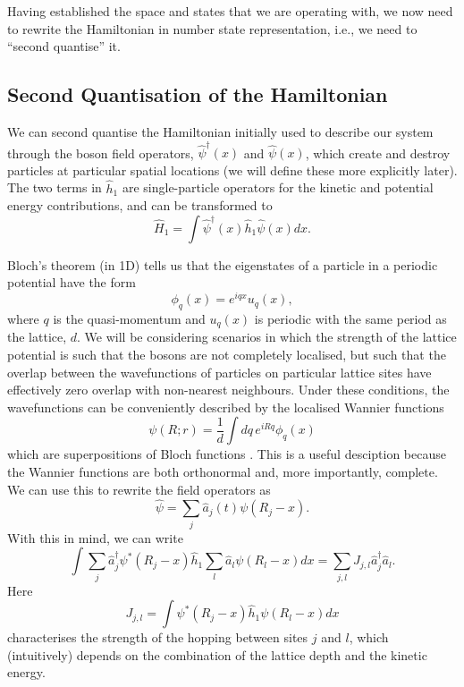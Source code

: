 \documentclass[a4paper,10pt]{article}
\begin{document}
Having established the space and states that we are operating with, we now need to rewrite the Hamiltonian in number state representation, i.e., we need to
``second quantise'' it. 

\subsection{Second Quantisation of the Hamiltonian}
We can second quantise the Hamiltonian initially used to describe our system through the boson field operators, $\hat{\psi}^{\dagger}(x)$ and $\hat{\psi}(x)$, which create and destroy 
particles at particular spatial locations (we will define these more explicitly later). The two terms in $\hat{h}_1$ are single-particle
operators for the kinetic and potential energy contributions, and can be transformed to
\begin{equation}
 \hat{H}_1=\int  \hat{\psi}^{\dagger}(x) \hat{h}_1   \hat{\psi}(x)dx.
\end{equation}

Bloch's theorem (in 1D) \cite{Bloch1929,Kittel1987} tells us that the eigenstates of a particle in a periodic potential have the form
\begin{equation}
 \phi_q(x)=e^{iqx}u_{q}(x),
\end{equation}
where $q$ is the quasi-momentum and $u_q(x)$ is periodic with the same period as the lattice, $d$. We will be considering scenarios in which the strength of the lattice potential
is such that the bosons are not completely localised, but such that the overlap between the wavefunctions of particles on particular lattice sites have effectively zero overlap 
with non-nearest neighbours. Under these conditions, the wavefunctions can be conveniently described by the localised Wannier functions
\begin{equation}
\psi(R;r)=\frac{1}{d}\int dq\, e^{iRq}\phi_q(x)
\end{equation}
which are superpositions of Bloch functions \cite{Kittel1987,Wannier1937}. This is a useful desciption because the Wannier functions are both orthonormal and, more importantly, complete.
We can use this to rewrite the field operators as 
\begin{equation}
\label{field_operators_wannier}
 \hat{\psi}=\sum_j \hat{a}_{j}(t)\psi(R_j-x).
\end{equation}
With this in mind, we can write
\begin{equation}
 \int  \sum_j\hat{a}_j^{\dagger}\psi^{*}(R_j-x) \hat{h}_1  \sum_l  \hat{a}_l\psi(R_l-x)dx=\sum_{j,l} J_{j,l}\hat{a}_{j}^{\dagger}\hat{a}_l.
\end{equation}
Here
\begin{equation}
 J_{j,l}=\int  \psi^{*}(R_j-x) \hat{h}_1  \psi(R_l-x)dx
\end{equation}
characterises the strength of the hopping between sites $j$ and $l$, which (intuitively) depends on the combination of the lattice depth and the kinetic energy. 
\end{document}
